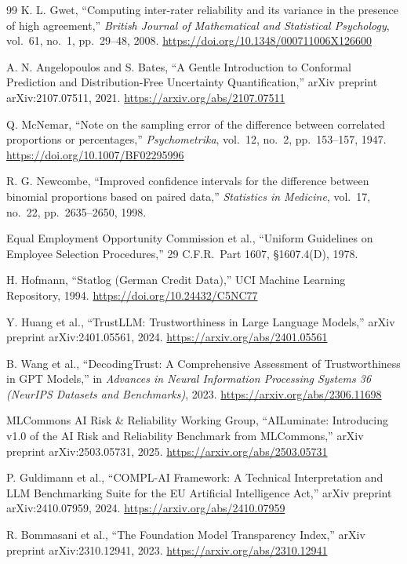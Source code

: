 \documentclass[11pt,a4paper]{article}
\begin{document}
\begin{thebibliography}{99}
 K. L. Gwet, ``Computing inter-rater reliability and its variance in the presence of high agreement,'' \emph{British Journal of Mathematical and Statistical Psychology}, vol.\ 61, no.\ 1, pp.\ 29--48, 2008. \url{https://doi.org/10.1348/000711006X126600}

 A. N. Angelopoulos and S. Bates, ``A Gentle Introduction to Conformal Prediction and Distribution-Free Uncertainty Quantification,'' arXiv preprint arXiv:2107.07511, 2021. \url{https://arxiv.org/abs/2107.07511}

 Q. McNemar, ``Note on the sampling error of the difference between correlated proportions or percentages,'' \emph{Psychometrika}, vol.\ 12, no.\ 2, pp.\ 153--157, 1947. \url{https://doi.org/10.1007/BF02295996}

 R. G. Newcombe, ``Improved confidence intervals for the difference between binomial proportions based on paired data,'' \emph{Statistics in Medicine}, vol.\ 17, no.\ 22, pp.\ 2635--2650, 1998.

 Equal Employment Opportunity Commission et al., ``Uniform Guidelines on Employee Selection Procedures,'' 29 C.F.R.\ Part 1607, \S 1607.4(D), 1978.

 H. Hofmann, ``Statlog (German Credit Data),'' UCI Machine Learning Repository, 1994. \url{https://doi.org/10.24432/C5NC77}

 Y. Huang et al., ``TrustLLM: Trustworthiness in Large Language Models,'' arXiv preprint arXiv:2401.05561, 2024. \url{https://arxiv.org/abs/2401.05561}

 B. Wang et al., ``DecodingTrust: A Comprehensive Assessment of Trustworthiness in GPT Models,'' in \emph{Advances in Neural Information Processing Systems 36 (NeurIPS Datasets and Benchmarks)}, 2023. \url{https://arxiv.org/abs/2306.11698}

 MLCommons AI Risk \& Reliability Working Group, ``AILuminate: Introducing v1.0 of the AI Risk and Reliability Benchmark from MLCommons,'' arXiv preprint arXiv:2503.05731, 2025. \url{https://arxiv.org/abs/2503.05731}

 P. Guldimann et al., ``COMPL-AI Framework: A Technical Interpretation and LLM Benchmarking Suite for the EU Artificial Intelligence Act,'' arXiv preprint arXiv:2410.07959, 2024. \url{https://arxiv.org/abs/2410.07959}

 R. Bommasani et al., ``The Foundation Model Transparency Index,'' arXiv preprint arXiv:2310.12941, 2023. \url{https://arxiv.org/abs/2310.12941}


\end{thebibliography}
\end{document}
